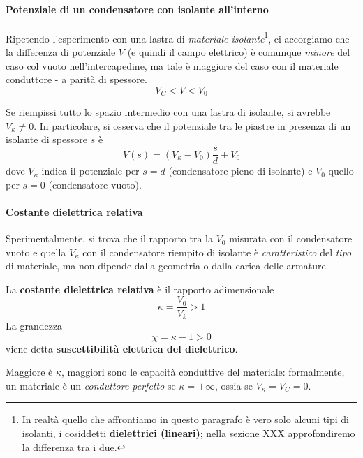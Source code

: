 \paragraph{Potenziale di un condensatore con isolante all'interno}
Ripetendo l'esperimento con una lastra di \textit{materiale isolante}\footnote{In realtà quello che affrontiamo in questo paragrafo è vero solo alcuni tipi di isolanti, i cosiddetti \textbf{dielettrici (lineari)}; nella sezione XXX approfondiremo la differenza tra i due.}, ci accorgiamo che la differenza di potenziale $V$ (e quindi il campo elettrico) è comunque \textit{minore} del caso col vuoto nell'intercapedine, ma tale \ddp è maggiore del caso con il materiale conduttore  - a parità di spessore.
\begin{equation*}
	V_{C}<V<V_0
\end{equation*} %

Se riempissi tutto lo spazio intermedio con una lastra di isolante, si avrebbe $V_{\kappa}\neq0$. In particolare, si osserva che il potenziale tra le piastre in presenza di un isolante di spessore $s$ è
\begin{equation*}
	V(s)=\left(V_{\kappa}-V_0\right)\frac{s}{d}+V_0
\end{equation*} 
dove $V_{\kappa}$ indica il potenziale per $s=d$ (condensatore pieno di isolante) e $V_0$ quello per $s=0$  (condensatore vuoto).
\paragraph{Costante dielettrica relativa}
Sperimentalmente, si trova che il rapporto tra la \ddp $V_0$ misurata con il condensatore vuoto e quella $V_{\kappa}$ con il condensatore riempito di isolante è \textit{caratteristico} del \textit{tipo} di materiale, ma non dipende dalla geometria o dalla carica delle armature.
\begin{define}
	La \textbf{costante dielettrica relativa} è il rapporto adimensionale
	\begin{equation}
		\kappa=\frac{V_0}{V_k}>1
	\end{equation}
	La grandezza
	\begin{equation}
		\chi=\kappa - 1>0
	\end{equation}
	viene detta \textbf{suscettibilità elettrica del dielettrico}.
\end{define}
Maggiore è $\kappa$, maggiori sono le capacità conduttive del materiale: formalmente, un materiale è un \textit{conduttore perfetto} se $\kappa=+\infty$, ossia se $V_{\kappa}=V_C=0$.


